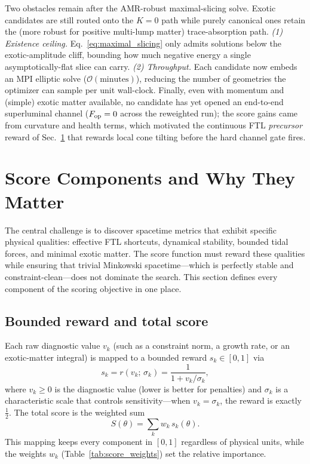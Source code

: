 \documentclass[twocolumn,floatfix,aps,prd,nofootinbib]{revtex4-2}
\begin{document}
Two obstacles remain after the AMR-robust maximal-slicing solve.  Exotic
candidates are still routed onto the $K=0$ path while purely canonical ones
retain the (more robust for positive multi-lump matter) trace-absorption path.
\emph{(1) Existence ceiling.}
Eq.~\eqref{eq:maximal_slicing} only admits solutions below the exotic-amplitude
cliff, bounding how much negative energy a single asymptotically-flat slice can
carry.  \emph{(2) Throughput.}  Each candidate now embeds an MPI elliptic solve
($\mathcal{O}(\text{minutes})$), reducing the number of geometries the optimizer
can sample per unit wall-clock.  Finally, even with momentum and (simple) exotic
matter available, no candidate has yet opened an end-to-end superluminal channel
($F_{\rm op}=0$ across the reweighted run); the score gains came from curvature
and health terms, which motivated the continuous FTL \emph{precursor} reward of
Sec.~\ref{sec:scoring} that rewards local cone tilting before the hard channel
gate fires.

\section{Score Components and Why They Matter}
\label{sec:scoring}

The central challenge is to discover spacetime metrics that exhibit specific physical qualities: effective FTL shortcuts, dynamical stability, bounded tidal forces, and minimal exotic matter.  The score function must reward these qualities while ensuring that trivial Minkowski spacetime---which is perfectly stable and constraint-clean---does not dominate the search.  This section defines every component of the scoring objective in one place.

\subsection{Bounded reward and total score}

Each raw diagnostic value $v_k$ (such as a constraint norm, a growth rate, or an exotic-matter integral) is mapped to a bounded reward $s_k \in [0,1]$ via
\begin{equation}
    s_k = r(v_k;\,\sigma_k) = \frac{1}{1 + v_k/\sigma_k},
    \label{eq:bounded_reward}
\end{equation}
where $v_k \ge 0$ is the diagnostic value (lower is better for penalties) and $\sigma_k$ is a characteristic scale that controls sensitivity---when $v_k = \sigma_k$, the reward is exactly $\tfrac{1}{2}$.  The total score is the weighted sum
\begin{equation}
    S(\theta) = \sum_{k} w_k\,s_k(\theta).
\end{equation}
This mapping keeps every component in $[0,1]$ regardless of physical units, while the weights $w_k$ (Table~\ref{tab:score_weights}) set the relative importance.
\end{document}
